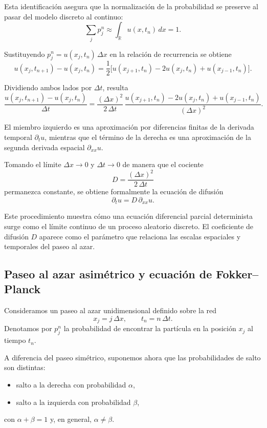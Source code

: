 \documentclass[12pt, a4paper]{amsbook}
\theoremstyle{remark}
\theoremstyle{definition}
\numberwithin{section}{chapter}
\numberwithin{subsection}{section}
\numberwithin{equation}{section}
\numberwithin{figure}{chapter}
\begin{document}
Esta identificación asegura que la normalización de la probabilidad se preserve al pasar del modelo discreto al continuo:
$$
\sum_j p_j^n \approx \int_{\mathbb{R}} u(x,t_n)\,dx = 1.
$$


Sustituyendo $p_j^n = u(x_j,t_n)\,\Delta x$ en la relación de recurrencia se obtiene
$$
u(x_j,t_{n+1}) - u(x_j,t_n) = \frac{1}{2}\bigl[u(x_{j+1},t_n) - 2u(x_j,t_n) + u(x_{j-1},t_n)\bigr].
$$

Dividiendo ambos lados por $\Delta t$, resulta
$$
\frac{u(x_j,t_{n+1}) - u(x_j,t_n)}{\Delta t} = \frac{(\Delta x)^2}{2\,\Delta t} \, \frac{u(x_{j+1},t_n) - 2u(x_j,t_n) + u(x_{j-1},t_n)}{(\Delta x)^2}.
$$

El miembro izquierdo es una aproximación por diferencias finitas de la derivada temporal $\partial_t u$, mientras que el término de la derecha es una aproximación de la segunda derivada espacial $\partial_{xx} u$.


Tomando el límite $\Delta x \to 0$ y $\Delta t \to 0$ de manera que el cociente
$$
D = \frac{(\Delta x)^2}{2\,\Delta t}
$$
permanezca constante, se obtiene formalmente la ecuación de difusión
$$
\partial_t u = D\,\partial_{xx} u.
$$

Este procedimiento muestra cómo una ecuación diferencial parcial determinista surge como el límite continuo de un proceso aleatorio discreto. El coeficiente de difusión $D$ aparece como el parámetro que relaciona las escalas espaciales y temporales del paseo al azar.


\subsection{Paseo al azar asimétrico y ecuación de Fokker--Planck}

Consideramos un paseo al azar unidimensional definido sobre la red
$$
x_j = j\,\Delta x, \qquad t_n = n\,\Delta t.
$$
Denotamos por $p_j^n$ la probabilidad de encontrar la partícula en la posición $x_j$ al tiempo $t_n$.

A diferencia del paseo simétrico, suponemos ahora que las probabilidades de salto son distintas:
\begin{itemize}
  \item salto a la derecha con probabilidad $\alpha$,
  \item salto a la izquierda con probabilidad $\beta$,
\end{itemize}
con $\alpha+\beta=1$ y, en general, $\alpha\neq\beta$.
\end{document}
